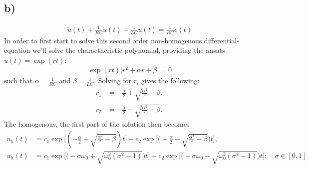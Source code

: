\documentclass{article}
\begin{document}
\subsection*{b)}
\begin{align*}
    \ddot{u}(t) + \frac{1}{RC}\dot{u}(t) + \frac{1}{LC}u(t) = \frac{1}{RC}\dot{e}(t)
\end{align*}
In order to first start to solve this second order non-homogenous differential-equation we'll solve the charactheristic polynomial, providing the ansats $u(t)= \exp(rt)$:
\begin{align*}
    \exp(rt)\Big[r^2 + \alpha r + \beta \Big]=0
\end{align*}such that $\alpha = \frac{1}{RC}$ and $\beta = \frac{1}{LC}$. Solving for $r_i$ gives the following:
\begin{align*}
    r_1 &= -\frac{\alpha}{2} + \sqrt{\frac{\alpha^2}{^2}-\beta},\\
r_2&= -\frac{\alpha}{2} - \sqrt{\frac{\alpha^2}{^2}-\beta}.
\end{align*}The homogenous, the first part of the solution then becomes
\begin{align*}
    u_{h}(t) &= c_1\exp\Bigg[(-\frac{\alpha}{2} + \sqrt{\frac{\alpha^2}{^2}-\beta})t\Bigg] + c_2\exp\Bigg[\Big(-\frac{\alpha}{2} - \sqrt{\frac{\alpha^2}{^2}-\beta}\Big)t\Bigg],\\
    u_h(t) &=c_1 \exp\Bigg[\Big(-\sigma\omega_0+\sqrt{\omega_0^2(\sigma^2 - 1)}\Big)t\Bigg] + c_2 \exp\Bigg[\Big(-\sigma\omega_0-\sqrt{\omega_0^2(\sigma^2 - 1)}\Big)t\Bigg];\quad \sigma \in[0,1]
\end{align*}
\end{document}
